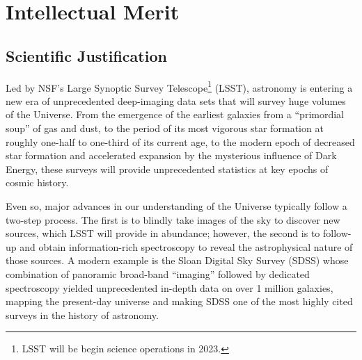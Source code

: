 \documentclass[oneside,11pt]{amsart}
\begin{document}

\clearpage
\setcounter{page}{1}

\noindent{}

\section{Intellectual Merit}
\label{sec:im}

\subsection{Scientific Justification} 

Led by NSF's Large Synoptic Survey Telescope\footnote{
%
LSST will be begin science operations in 2023.}
%
(LSST), astronomy is entering a new era of unprecedented deep-imaging
data sets that will survey huge volumes of the Universe.  From the
emergence of the earliest galaxies from a ``primordial soup'' of gas and
dust, to the period of its most vigorous star formation at roughly
one-half to one-third of its current age, to the modern epoch of
decreased star formation and accelerated expansion by the mysterious
influence of Dark Energy, these surveys will provide unprecedented
statistics at key epochs of cosmic history.



Even so, major advances in our understanding of the Universe typically
follow a two-step process.  The first is to blindly take images of the
sky to discover new sources, which LSST will provide in abundance;
however, the second is to follow-up and obtain information-rich
spectroscopy to reveal the astrophysical nature of those sources.  A
modern example is the Sloan Digital Sky Survey (SDSS) whose combination
of panoramic broad-band ``imaging'' followed by dedicated spectroscopy
yielded unprecedented in-depth data on over 1 million galaxies, mapping
the present-day universe and making SDSS one of the most highly cited
surveys in the history of astronomy.
\end{document}
